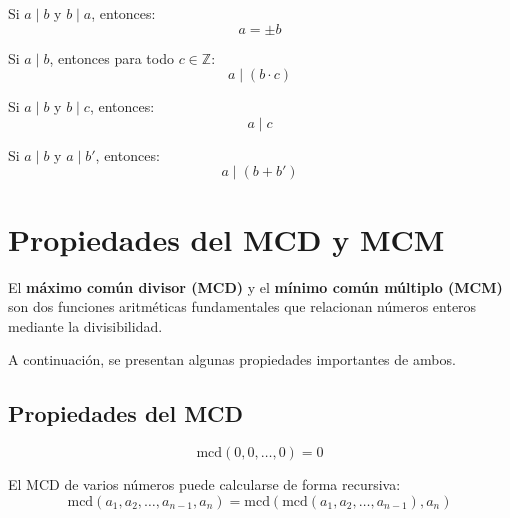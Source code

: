 \documentclass[a4paper,12pt]{article}
\begin{document}
\begin{procedimiento}[title={Propiedad 2}]
Si \( a \mid b \) y \( b \mid a \), entonces:
\[
a = \pm b
\]
\end{procedimiento}

\begin{procedimiento}[title={Propiedad 3}]
Si \( a \mid b \), entonces para todo \( c \in \mathbb{Z} \):
\[
a \mid (b \cdot c)
\]
\end{procedimiento}

\begin{procedimiento}[title={Propiedad 4}]
Si \( a \mid b \) y \( b \mid c \), entonces:
\[
a \mid c
\]
\end{procedimiento}

\begin{procedimiento}[title={Propiedad 5}]
Si \( a \mid b \) y \( a \mid b' \), entonces:
\[
a \mid (b + b')
\]
\end{procedimiento}



\section{Propiedades del MCD y MCM}

El \textbf{máximo común divisor (MCD)} y el \textbf{mínimo común múltiplo (MCM)} son dos funciones aritméticas fundamentales que relacionan números enteros mediante la divisibilidad.

A continuación, se presentan algunas propiedades importantes de ambos.


\subsection{Propiedades del MCD}

\begin{procedimiento}[title={Propiedad 1}]
\[
\text{mcd}(0,0,\ldots,0) = 0
\]
\end{procedimiento}

\begin{procedimiento}[title={Propiedad 2}]
El MCD de varios números puede calcularse de forma recursiva:
\[
\text{mcd}(a_1,a_2,\ldots,a_{n-1},a_n) = \text{mcd}(\text{mcd}(a_1,a_2,\ldots,a_{n-1}),a_n)
\]
\end{procedimiento}
\end{document}
